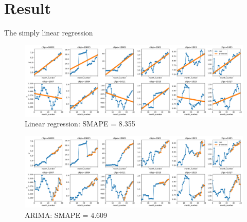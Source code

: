 \documentclass[prl,aps,superscriptaddress,twocolumn,10pt,nolongbibliography]{revtex4-2}
\begin{document}
\section{Result}
The simply linear regression 
\begin{figure}
\includegraphics[width=7in]{figs/linear.pdf}
\caption{\label{fig:}
Linear regression: SMAPE = 8.355
}
\end{figure}


\begin{figure}
\includegraphics[width=7in]{figs/arima.pdf}
\caption{\label{fig:arima}
ARIMA: SMAPE = 4.609
}
\end{figure}


{}
\end{document}
